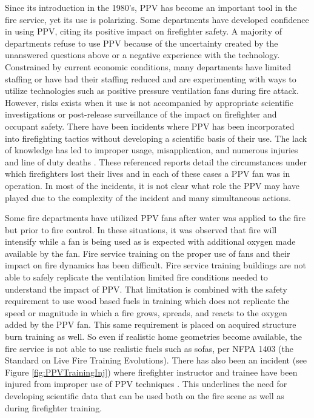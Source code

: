 \documentclass{article}
\begin{document}
Since its introduction in the 1980’s, PPV has become an important tool in the fire service, yet its use is polarizing. Some departments have developed confidence in using PPV, citing its positive impact on firefighter safety. A majority of departments refuse to use PPV because of the uncertainty created by the unanswered questions above or a negative experience with the technology. Constrained by current economic conditions, many departments have limited staffing or have had their staffing reduced and are experimenting with ways to utilize technologies such as positive pressure ventilation fans during fire attack. However, risks exists when it use is not accompanied by appropriate scientific investigations or post-release surveillance of the impact on firefighter and occupant safety. There have been incidents where PPV has been incorporated into firefighting tactics without developing a scientific basis of their use. The lack of knowledge has led to improper usage, misapplication, and numerous injuries and line of duty deaths \cite{NIOSHF2000-44} \cite{NIOSH98F-32} \cite{TexasFMFY07-02} \cite{ContraCostaFalaityInvestigation} \cite{NIOSHF2004-02} \cite{NIOSHF2002-12}. These referenced reports detail the circumstances under which firefighters lost their lives and in each of these cases a PPV fan was in operation. In most of the incidents, it is not clear what role the PPV may have played due to the complexity of the incident and many simultaneous actions. 
 
Some fire departments have utilized PPV fans after water was applied to the fire but prior to fire control. In these situations, it was observed that fire will intensify while a fan is being used as is expected with additional oxygen made available by the fan. Fire service training on the proper use of fans and their impact on fire dynamics has been difficult. Fire service training buildings are not able to safely replicate the ventilation limited fire conditions needed to understand the impact of PPV. That limitation is combined with the safety requirement to use wood based fuels in training which does not replicate the speed or magnitude in which a fire grows, spreads, and reacts to the oxygen added by the PPV fan. This same requirement is placed on acquired structure burn training as well. So even if realistic home geometries become available, the fire service is not able to use realistic fuels such as sofas, per NFPA 1403 (the Standard on Live Fire Training Evolutions). There has also been an incident (see Figure \ref{fig:PPVTrainingInj}) where firefighter instructor and trainee have been injured from improper use of PPV techniques \cite{LasVegasNews_ChiefsRole}. This underlines the need for developing scientific data that can be used both on the fire scene as well as during firefighter training.
\end{document}
